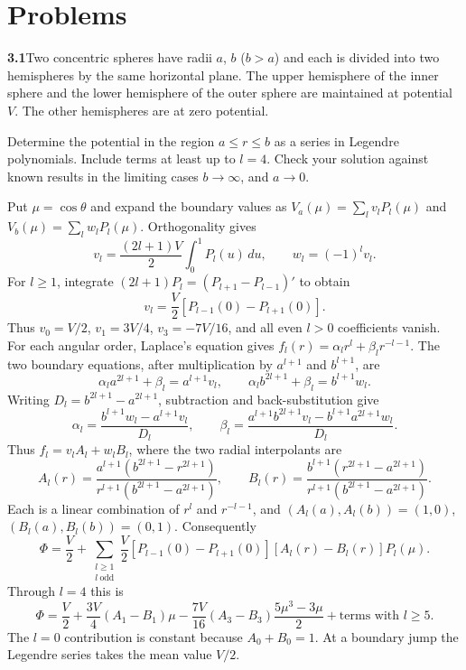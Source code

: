 
\section*{Problems}

\par\bigskip
\noindent\textbf{3.1}\quad Two concentric spheres have radii $a$, $b$ ($b>a$) and each is divided into two hemispheres by the same horizontal plane. The upper hemisphere of the inner sphere and the lower hemisphere of the outer sphere are maintained at potential $V$. The other hemispheres are at zero potential.

Determine the potential in the region $a\leq r\leq b$ as a series in Legendre polynomials. Include terms at least up to $l=4$. Check your solution against known results in the limiting cases $b\to\infty$, and $a\to0$.
\solution

Put $\mu=\cos\theta$ and expand the boundary values as
$V_a(\mu)=\sum_l v_lP_l(\mu)$ and $V_b(\mu)=\sum_l w_lP_l(\mu)$.
Orthogonality gives
\[
v_l=\frac{(2l+1)V}{2}\int_0^1P_l(u)\,du,\qquad
w_l=(-1)^lv_l.
\]
For $l\geq1$, integrate
$(2l+1)P_l=(P_{l+1}-P_{l-1})'$ to obtain
\[
v_l=\frac V2[P_{l-1}(0)-P_{l+1}(0)].
\]
Thus $v_0=V/2$, $v_1=3V/4$, $v_3=-7V/16$, and all even
$l>0$ coefficients vanish.  For each angular order, Laplace's
equation gives $f_l(r)=\alpha_lr^l+\beta_lr^{-l-1}$.  The two
boundary equations, after multiplication by $a^{l+1}$ and $b^{l+1}$,
are
\[
\alpha_la^{2l+1}+\beta_l=a^{l+1}v_l,\qquad
\alpha_lb^{2l+1}+\beta_l=b^{l+1}w_l.
\]
Writing $D_l=b^{2l+1}-a^{2l+1}$, subtraction and back-substitution give
\[
\alpha_l=\frac{b^{l+1}w_l-a^{l+1}v_l}{D_l},\qquad
\beta_l=\frac{a^{l+1}b^{2l+1}v_l-b^{l+1}a^{2l+1}w_l}{D_l}.
\]
Thus $f_l=v_lA_l+w_lB_l$, where the two radial interpolants are
\[
A_l(r)=\frac{a^{l+1}(b^{2l+1}-r^{2l+1})}
 {r^{l+1}(b^{2l+1}-a^{2l+1})},\qquad
B_l(r)=\frac{b^{l+1}(r^{2l+1}-a^{2l+1})}
 {r^{l+1}(b^{2l+1}-a^{2l+1})}.
\]
Each is a linear combination of $r^l$ and $r^{-l-1}$, and
$(A_l(a),A_l(b))=(1,0)$, $(B_l(a),B_l(b))=(0,1)$.
Consequently
\[
\boxed{\Phi=\frac V2+
\sum_{\substack{l\geq1\\l\ \mathrm{odd}}}
\frac V2[P_{l-1}(0)-P_{l+1}(0)]
[A_l(r)-B_l(r)]P_l(\mu).}
\]
Through $l=4$ this is
\[
\Phi=\frac V2+\frac{3V}{4}(A_1-B_1)\mu
-\frac{7V}{16}(A_3-B_3)\frac{5\mu^3-3\mu}{2}
+\text{terms with }l\geq5.
\]
The $l=0$ contribution is constant because $A_0+B_0=1$.
At a boundary jump the Legendre series takes the mean value $V/2$.

